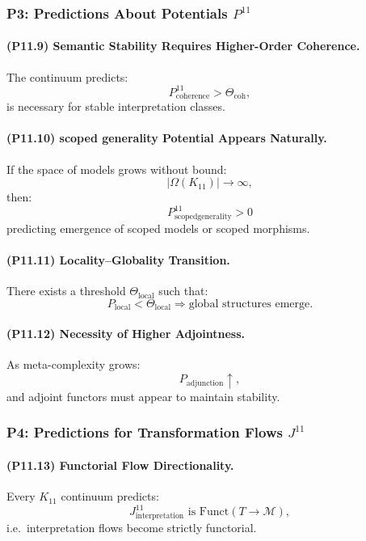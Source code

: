 \subsubsection{P3: Predictions About Potentials $P^{11}$}

\paragraph{(P11.9) Semantic Stability Requires Higher-Order Coherence.}
The continuum predicts:
\[
P_{\mathrm{coherence}}^{11} > \Theta_{\mathrm{coh}},
\]
is necessary for stable interpretation classes.

\paragraph{(P11.10) scoped generality Potential Appears Naturally.}
If the space of models grows without bound:
\[
|\Omega(K_{11})| \to \infty,
\]
then:
\[
P_{\mathrm{scoped generality}}^{11} > 0
\]
predicting emergence of scoped models or scoped morphisms.

\paragraph{(P11.11) Locality–Globality Transition.}
There exists a threshold $\Theta_{\mathrm{local}}$ such that:
\[
P_{\mathrm{local}} < \Theta_{\mathrm{local}}
\Rightarrow
\text{global structures emerge}.
\]

\paragraph{(P11.12) Necessity of Higher Adjointness.}
As meta-complexity grows:
\[
P_{\mathrm{adjunction}} \uparrow,
\]
and adjoint functors must appear to maintain stability.

\subsubsection{P4: Predictions for Transformation Flows $J^{11}$}

\paragraph{(P11.13) Functorial Flow Directionality.}
Every $K_{11}$ continuum predicts:
\[
J_{\mathrm{interpretation}}^{11}
\text{ is } \mathrm{Funct}(T \to \mathcal{M}),
\]
i.e.\ interpretation flows become strictly functorial.

